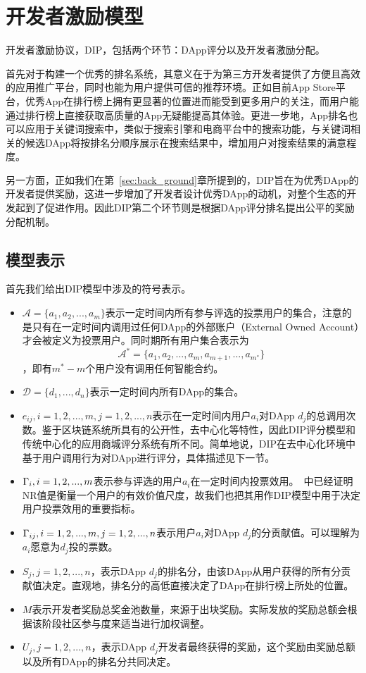 \section{开发者激励模型}
开发者激励协议，DIP，包括两个环节：DApp评分以及开发者激励分配。

首先对于构建一个优秀的排名系统，其意义在于为第三方开发者提供了方便且高效的应用推广平台，同时也能为用户提供可信的推荐环境。正如目前App Store平台，优秀App在排行榜上拥有更显著的位置进而能受到更多用户的关注，而用户能通过排行榜上直接获取高质量的App无疑能提高其体验。更进一步地，App排名也可以应用于关键词搜索中，类似于搜索引擎和电商平台中的搜索功能，与关键词相关的候选DApp将按排名分顺序展示在搜索结果中，增加用户对搜索结果的满意程度。

另一方面，正如我们在第~\ref{sec:back_ground}章所提到的，DIP旨在为优秀DApp的开发者提供奖励，这进一步增加了开发者设计优秀DApp的动机，对整个生态的开发起到了促进作用。因此DIP第二个环节则是根据DApp评分排名提出公平的奖励分配机制。

\subsection{模型表示}
\label{subsection:parameters}
首先我们给出DIP模型中涉及的符号表示。
\begin{itemize}
	\item $\mathcal{A}=\{a_1,a_2,...,a_m\}$表示一定时间内所有参与评选的投票用户的集合，注意的是只有在一定时间内调用过任何DApp的外部账户（External Owned Account）才会被定义为投票用户。同时期所有用户集合表示为$$\mathcal{A}^*=\{a_1,a_2,...,a_m,a_{m+1},...,a_{m^*}\}$$，即有$m^*-m$个用户没有调用任何智能合约。
	\item $\mathcal{D}=\{d_1,...,d_n\}$表示一定时间内所有DApp的集合。
	\item $e_{ij},i=1,2,...,m, j=1,2,...,n$表示在一定时间内用户$a_i$对DApp $d_j$的总调用次数。鉴于区块链系统所具有的公开性，去中心化等特性，因此DIP评分模型和传统中心化的应用商城评分系统有所不同。简单地说，DIP在去中心化环境中基于用户调用行为对DApp进行评分，具体描述见下一节。
	\item $\Gamma_i, i=1,2,...,m$表示参与评选的用户$a_i$在一定时间内投票效用。~\cite{Nebulasyellowpaper}中已经证明NR值是衡量一个用户的有效价值尺度，故我们也把其用作DIP模型中用于决定用户投票效用的重要指标。
	\item $\Gamma_{ij}, i=1,2,...,m,j=1,2,...,n$表示用户$a_i$对DApp $d_j$的分贡献值。可以理解为$a_i$愿意为$d_j$投的票数。%
	\item $S_j, j=1,2,...,n$，表示DApp $d_j$的排名分，由该DApp从用户获得的所有分贡献值决定。直观地，排名分的高低直接决定了DApp在排行榜上所处的位置。
	\item $M$表示开发者奖励总奖金池数量，来源于出块奖励。实际发放的奖励总额会根据该阶段社区参与度来适当进行加权调整。
	\item $U_j, j=1,2,...,n$，表示DApp $d_j$开发者最终获得的奖励，这个奖励由奖励总额以及所有DApp的排名分共同决定。
\end{itemize}

